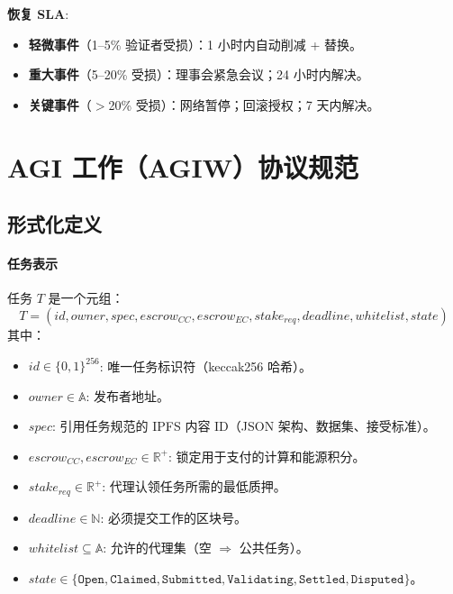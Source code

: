 \documentclass[11pt]{article}
\begin{document}
\textbf{恢复 SLA}:
\begin{itemize}[noitemsep]
  \item \textbf{轻微事件}（1--5\% 验证者受损）：1 小时内自动削减 + 替换。
  \item \textbf{重大事件}（5--20\% 受损）：理事会紧急会议；24 小时内解决。
  \item \textbf{关键事件}（$>$20\% 受损）：网络暂停；回滚授权；7 天内解决。
\end{itemize}

\section{AGI 工作（AGIW）协议规范}
\label{sec:agiw-spec}

\subsection{形式化定义}
\paragraph{任务表示} 任务 $T$ 是一个元组：
\begin{equation}
T = (id, owner, spec, escrow_{CC}, escrow_{EC}, stake_{req}, deadline, whitelist, state)
\end{equation}
其中：
\begin{itemize}[noitemsep]
  \item $id \in \{0,1\}^{256}$: 唯一任务标识符（keccak256 哈希）。
  \item $owner \in \mathbb{A}$: 发布者地址。
  \item $spec$: 引用任务规范的 IPFS 内容 ID（JSON 架构、数据集、接受标准）。
  \item $escrow_{CC}, escrow_{EC} \in \mathbb{R}^+$: 锁定用于支付的计算和能源积分。
  \item $stake_{req} \in \mathbb{R}^+$: 代理认领任务所需的最低质押。
  \item $deadline \in \mathbb{N}$: 必须提交工作的区块号。
  \item $whitelist \subseteq \mathbb{A}$: 允许的代理集（空 $\Rightarrow$ 公共任务）。
  \item $state \in \{\texttt{Open}, \texttt{Claimed}, \texttt{Submitted}, \texttt{Validating}, \texttt{Settled}, \texttt{Disputed}\}$。
\end{itemize}
\end{document}
